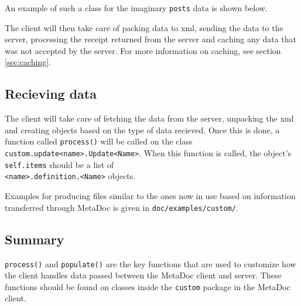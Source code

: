 An example of such a class for the imaginary \texttt{posts} data is shown
below.


The client will then take care of packing data to \gls{xml}, sending the data
to the server, processing the receipt returned from the server and caching any
data that was not accepted by the server. For more information on caching, see
section \ref{sec:caching}.

\subsection{Recieving data}
\label{sec:customizing_client_recieve}
The client will take care of fetching the data from the server, unpacking the
\gls{xml} and creating objects based on the type of data recieved. Once this is
done, a function called \texttt{process()} will be called on the class
\texttt{custom.update<name>.Update<Name>}. When this function is called, the
object's \texttt{self.items} should be a list of \\
\texttt{<name>.definition.<Name>} objects.

Examples for producing files similar to the ones now in use based on
information transferred through MetaDoc is given in
\texttt{doc/examples/custom/}.

\subsection{Summary}
\texttt{process()} and \texttt{populate()} are the key functions that are used
to customize how the client handles data passed between the MetaDoc client and
server. These functions should be found on classes inside the \texttt{custom}
package in the MetaDoc client. 
